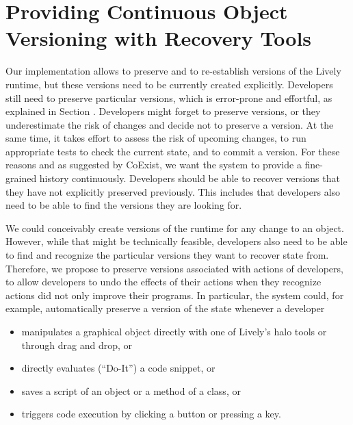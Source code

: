 \section{Providing Continuous Object Versioning with Recovery Tools}

Our implementation allows to preserve and to re-establish versions of the Lively runtime, but these versions need to be currently created explicitly.
Developers still need to preserve particular versions, which is error-prone and effortful, as explained in Section . Developers might forget to preserve versions, or they underestimate the risk of changes and decide not to preserve a version.
At the same time, it takes effort to assess the risk of upcoming changes, to run appropriate tests to check the current state, and to commit a version.
For these reasons and as suggested by CoExist, we want the system to provide a fine-grained history continuously.
Developers should be able to recover versions that they have not explicitly preserved previously.
This includes that developers also need to be able to find the versions they are looking for.

We could conceivably create versions of the runtime for any change to an object.
However, while that might be technically feasible, developers also need to be able to find and recognize the particular versions they want to recover state from.
Therefore, we propose to preserve versions associated with actions of developers, to allow developers to undo the effects of their actions when they recognize actions did not only improve their programs.
In particular, the system could, for example, automatically preserve a version of the state whenever a developer
\begin{itemize}
    \item manipulates a graphical object directly with one of Lively's halo tools or through drag and drop, or
    \item directly evaluates (``Do-It'') a code snippet, or
    \item saves a script of an object or a method of a class, or
    \item triggers code execution by clicking a button or pressing a key.
\end{itemize}

